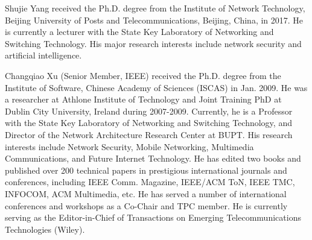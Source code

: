 \documentclass[lettersize,journal]{IEEEtran}
\begin{document}
\begin{IEEEbiography}{Shujie Yang} received the Ph.D. degree from the Institute of Network Technology, Beijing University of Posts and Telecommunications, Beijing, China, in 2017. He is currently a lecturer with the State Key Laboratory of Networking and Switching Technology. His major research interests include network security and artificial intelligence.
\end{IEEEbiography}

\vspace{11pt}

\begin{IEEEbiography}{Changqiao Xu}
(Senior Member, IEEE) received the Ph.D. degree from the Institute of Software, Chinese Academy of Sciences (ISCAS) in Jan. 2009. He was a researcher at Athlone Institute of Technology and Joint Training PhD at Dublin City University, Ireland during 2007-2009. %
Currently, he is a Professor with the State Key Laboratory of Networking and Switching Technology, and Director of the Network Architecture Research Center at BUPT. His research interests include Network Security, Mobile Networking, Multimedia Communications, and Future Internet Technology. He has edited two books and published over 200 technical papers in prestigious international journals and conferences, including IEEE Comm. Magazine, IEEE/ACM ToN, IEEE TMC, INFOCOM, ACM Multimedia, etc. He has served a number of international conferences and workshops as a Co-Chair and TPC member. He is currently serving as the Editor-in-Chief of Transactions on Emerging Telecommunications Technologies (Wiley).
\end{IEEEbiography}






\vfill
\end{document}
